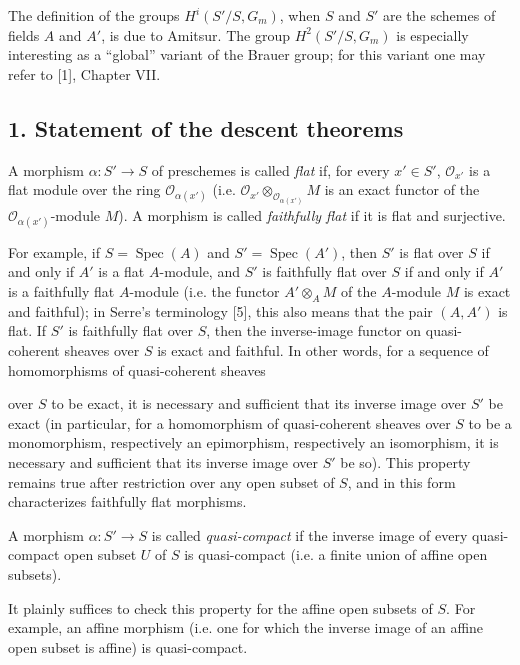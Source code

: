  The definition of the groups $H^i(S'/S,G_m)$, when $S$ and
$S'$ are the schemes of fields $A$ and $A'$, is due to Amitsur. The group
$H^2(S'/S,G_m)$ is especially interesting as a “global” variant of the Brauer
group; for this variant one may refer to [1], Chapter VII.


\subsection*{1. Statement of the descent theorems}

 A morphism
$\alpha:S'\longrightarrow S$ of preschemes is called \emph{flat} if, for every
$x'\in S'$, $\mathcal O_{x'}$ is a flat module over the ring
$\mathcal O_{\alpha(x')}$ (i.e.
$\mathcal O_{x'}\otimes_{\mathcal O_{\alpha(x')}}M$ is an exact functor of the
$\mathcal O_{\alpha(x')}$-module $M$). A morphism is called
\emph{faithfully flat} if it is flat and surjective.

For example, if $S=\operatorname{Spec}(A)$ and
$S'=\operatorname{Spec}(A')$, then $S'$ is flat over $S$ if and only if $A'$
is a flat $A$-module, and $S'$ is faithfully flat over $S$ if and only if $A'$
is a faithfully flat $A$-module (i.e. the functor $A'\otimes_A M$ of the
$A$-module $M$ is exact and faithful); in Serre's terminology [5], this also
means that the pair $(A,A')$ is flat. If $S'$ is faithfully flat over $S$,
then the inverse-image functor on quasi-coherent sheaves over $S$ is exact and
faithful. In other words, for a sequence of homomorphisms of quasi-coherent
sheaves

over $S$ to be exact, it is necessary and sufficient that its inverse image
over $S'$ be exact (in particular, for a homomorphism of quasi-coherent sheaves
over $S$ to be a monomorphism, respectively an epimorphism, respectively an
isomorphism, it is necessary and sufficient that its inverse image over $S'$
be so). This property remains true after restriction over any open subset of
$S$, and in this form characterizes faithfully flat morphisms.

 A morphism $\alpha:S'\longrightarrow S$ is called
\emph{quasi-compact} if the inverse image of every quasi-compact open subset
$U$ of $S$ is quasi-compact (i.e. a finite union of affine open subsets).

It plainly suffices to check this property for the affine open subsets of
$S$. For example, an affine morphism (i.e. one for which the inverse image of
an affine open subset is affine) is quasi-compact.

